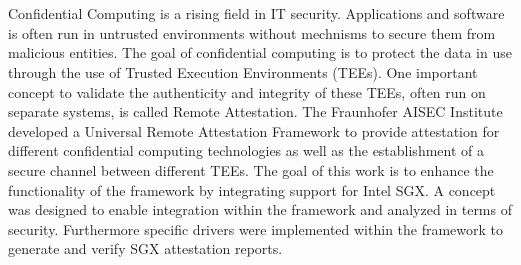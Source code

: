 \chapter{\abstractname}


Confidential Computing is a rising field in IT security. Applications and software is often run in untrusted environments without mechnisms to secure them from malicious entities. The goal of confidential computing is to protect the data in use through the use of Trusted Execution Environments (TEEs). One important concept to validate the authenticity and integrity of these TEEs, often run on separate systems, is called Remote Attestation. The Fraunhofer AISEC Institute developed a Universal Remote Attestation Framework to provide attestation for different confidential computing technologies as well as the establishment of a secure channel between different TEEs. The goal of this work is to enhance the functionality of the framework by integrating support for Intel SGX.
A concept was designed to enable integration within the framework and analyzed in terms of security. Furthermore specific drivers were implemented within the framework to generate and verify SGX attestation reports. 